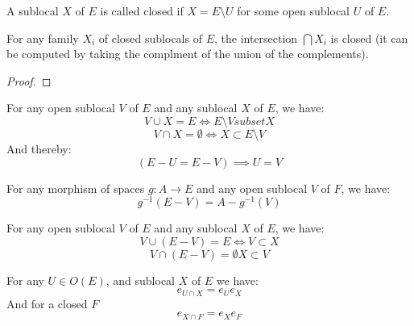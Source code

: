 \begin{definition}
    \label{def:closed_sublocal}
    \leanok
    A sublocal $X$ of $E$ is called closed if $X = E \setminus U$ for some open sublocal $U$ of $E$.
\end{definition}

\begin{lemma}
    \label{def:closed_intersection}
    \leanok
    For any family $X_i$ of closed sublocals of $E$, the intersection $\bigcap X_i$ is closed (it can be computed by
    taking the complment of the union of the complements).
\end{lemma}
\begin{proof}
    \leanok
\end{proof}


\begin{lemma}
    \label{lem:properties_of_complements}
    For any open sublocal $V$ of $E$ and any sublocal $X$ of $E$, we have:
    \[V \cup X = E \iff E \setminus V subset X\]
    \[V \cap X = \emptyset \iff X \subset E \setminus V\]
    And thereby:
    \[(E - U = E - V) \implies U = V\]
\end{lemma}

\begin{lemma}
    \label{lem:preimage_of_complements}
    For any morphism of spaces $g: A \to E$ and any open sublocal $V$ of $F$, we have:
    \[g^{-1}(E - V) = A - g^{-1}(V)\]
\end{lemma}

\begin{lemma}
    \label{lem:properties_of_complements_part_2}
    For any open sublocal $V$ of $E$ and any sublocal $X$ of $E$, we have:
    \[V \cup (E - V) = E \iff V \subset X \]
    \[V \cap (E - V) = \emptyset X \subset V\]
\end{lemma}


\begin{lemma}
    \label{lem:open_closed_intersection}
    For any $U \in O(E)$, and sublocal $X$ of $E$ we have:
    \[e_{U \cap X} = e_Ue_X\]
    And for a closed $F$
    \[e_{X \cap F} = e_Xe_F\]
\end{lemma}

